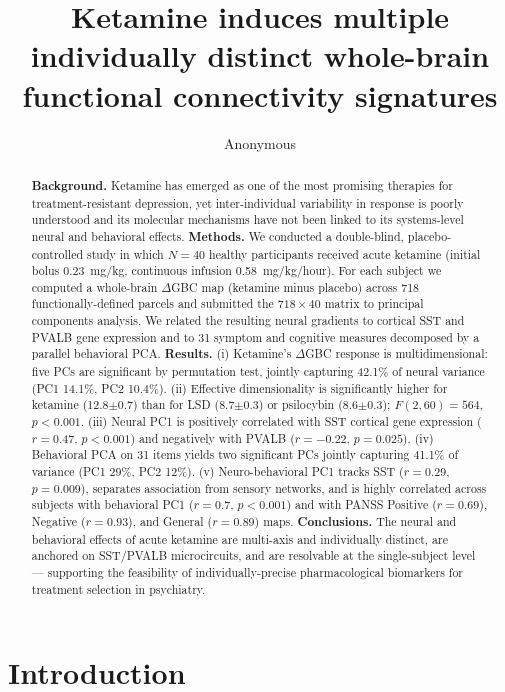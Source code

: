 \documentclass[11pt]{article}
\title{\textbf{Ketamine induces multiple individually distinct whole-brain
functional connectivity signatures}}
\author{Anonymous}
\date{}
\begin{document}
\maketitle
\linenumbers

\begin{abstract}
\noindent\textbf{Background.} Ketamine has emerged as one of the most promising
therapies for treatment-resistant depression, yet inter-individual variability
in response is poorly understood and its molecular mechanisms have not been
linked to its systems-level neural and behavioral effects.
\textbf{Methods.} We conducted a double-blind, placebo-controlled study in
which $N=40$ healthy participants received acute ketamine (initial bolus
0.23~mg/kg, continuous infusion 0.58~mg/kg/hour). For each subject we
computed a whole-brain $\Delta$GBC map (ketamine minus placebo) across 718
functionally-defined parcels and submitted the $718\times40$ matrix to
principal components analysis. We related the resulting neural gradients to
cortical SST and PVALB gene expression and to 31 symptom and cognitive
measures decomposed by a parallel behavioral PCA.
\textbf{Results.} (i) Ketamine's $\Delta$GBC response is multidimensional:
five PCs are significant by permutation test, jointly capturing 42.1\% of
neural variance (PC1 14.1\%, PC2 10.4\%). (ii) Effective dimensionality is
significantly higher for ketamine (12.8$\pm$0.7) than for LSD (8.7$\pm$0.3)
or psilocybin (8.6$\pm$0.3); $F(2,60)=564$, $p<0.001$. (iii) Neural PC1 is
positively correlated with SST cortical gene expression ($r=0.47$,
$p<0.001$) and negatively with PVALB ($r=-0.22$, $p=0.025$). (iv) Behavioral
PCA on 31 items yields two significant PCs jointly capturing 41.1\% of
variance (PC1 29\%, PC2 12\%). (v) Neuro-behavioral PC1 tracks SST
($r=0.29$, $p=0.009$), separates association from sensory networks, and is
highly correlated across subjects with behavioral PC1 ($r=0.7$, $p<0.001$)
and with PANSS Positive ($r=0.69$), Negative ($r=0.93$), and General
($r=0.89$) maps.
\textbf{Conclusions.} The neural and behavioral effects of acute ketamine
are multi-axis and individually distinct, are anchored on SST/PVALB
microcircuits, and are resolvable at the single-subject level --- supporting
the feasibility of individually-precise pharmacological biomarkers for
treatment selection in psychiatry.
\end{abstract}

\section{Introduction}
\end{document}
